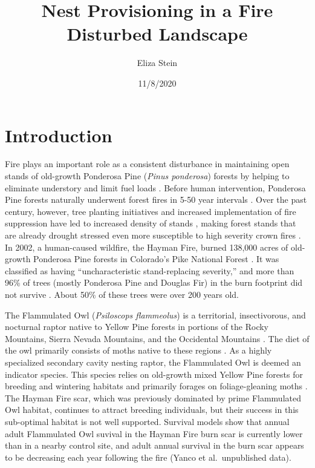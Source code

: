 \documentclass[]{article}
\title{Nest Provisioning in a Fire Disturbed Landscape}
\author{Eliza Stein}
\date{11/8/2020}
\begin{document}
\maketitle

\hypertarget{introduction}{%
\section{Introduction}\label{introduction}}

Fire plays an important role as a consistent disturbance in maintaining
open stands of old-growth Ponderosa Pine (\emph{Pinus ponderosa})
forests by helping to eliminate understory and limit fuel loads
\citep{veblen2000climatic}. Before human intervention, Ponderosa Pine
forests naturally underwent forest fires in 5-50 year intervals
\citep{veblen2000climatic}. Over the past century, however, tree
planting initiatives and increased implementation of fire suppression
have led to increased density of stands \citep{griffis2001understory},
making forest stands that are already drought stressed even more
susceptible to high severity crown fires \citep{veblen2000climatic}. In
2002, a human-caused wildfire, the Hayman Fire, burned 138,000 acres of
old-growth Ponderosa Pine forests in Colorado's Pike National Forest
\citep{graham2003hayman}. It was classified as having ``uncharacteristic
stand-replacing severity,'' and more than 96\% of trees (mostly
Ponderosa Pine and Douglas Fir) in the burn footprint did not survive
\citep{fornwalt2016did}. About 50\% of these trees were over 200 years
old.

The Flammulated Owl (\emph{Psiloscops flammeolus}) is a territorial,
insectivorous, and nocturnal raptor native to Yellow Pine forests in
portions of the Rocky Mountains, Sierra Nevada Mountains, and the
Occidental Mountains \citep{linkhart2013flammulated}. The diet of the
owl primarily consists of moths native to these regions
\citep{linkhart2013flammulated}. As a highly specialized secondary
cavity nesting raptor, the Flammulated Owl is deemed an indicator
species. This species relies on old-growth mixed Yellow Pine forests for
breeding and wintering habitats and primarily forages on
foliage-gleaning moths \citep{reynolds1992flammulated}. The Hayman Fire
scar, which was previously dominated by prime Flammulated Owl habitat,
continues to attract breeding individuals, but their success in this
sub-optimal habitat is not well supported. Survival models show that
annual adult Flammulated Owl suvival in the Hayman Fire burn scar is
currently lower than in a nearby control site, and adult annual survival
in the burn scar appears to be decreasing each year following the fire
(Yanco et al.~unpublished data).
\end{document}
